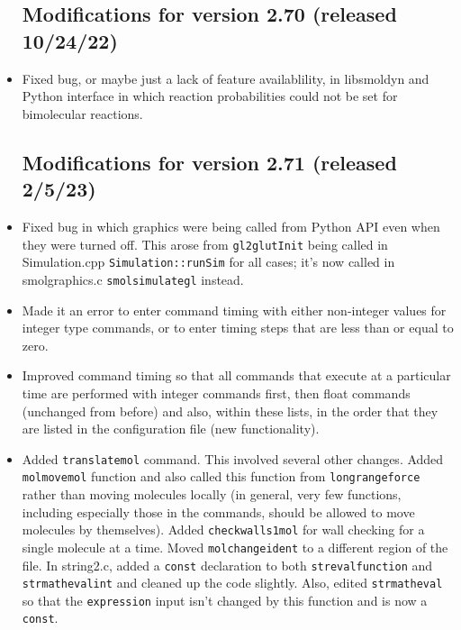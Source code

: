 \documentclass {scrbook}
\newcommand {\ttt} {\texttt}
\begin{document}
\begin{itemize}
\subsection{Modifications for version 2.70 (released 10/24/22)}
\item Fixed bug, or maybe just a lack of feature availablility, in libsmoldyn and Python interface in which reaction probabilities could not be set for bimolecular reactions.

\subsection{Modifications for version 2.71 (released 2/5/23)}
\item Fixed bug in which graphics were being called from Python API even when they were turned off. This arose from \ttt{gl2glutInit} being called in Simulation.cpp \ttt{Simulation::runSim} for all cases; it's now called in smolgraphics.c \ttt{smolsimulategl} instead.
\item Made it an error to enter command timing with either non-integer values for integer type commands, or to enter timing steps that are less than or equal to zero.
\item Improved command timing so that all commands that execute at a particular time are performed with integer commands first, then float commands (unchanged from before) and also, within these lists, in the order that they are listed in the configuration file (new functionality).
\item Added \ttt{translatemol} command. This involved several other changes. Added \ttt{molmovemol} function and also called this function from \ttt{longrangeforce} rather than moving molecules locally (in general, very few functions, including especially those in the commands, should be allowed to move molecules by themselves). Added \ttt{checkwalls1mol} for wall checking for a single molecule at a time. Moved \ttt{molchangeident} to a different region of the file. In string2.c, added a \ttt{const} declaration to both \ttt{strevalfunction} and \ttt{strmathevalint} and cleaned up the code slightly. Also, edited \ttt{strmatheval} so that the \ttt{expression} input isn't changed by this function and is now a \ttt{const}.


\end{itemize}
\end{document}

